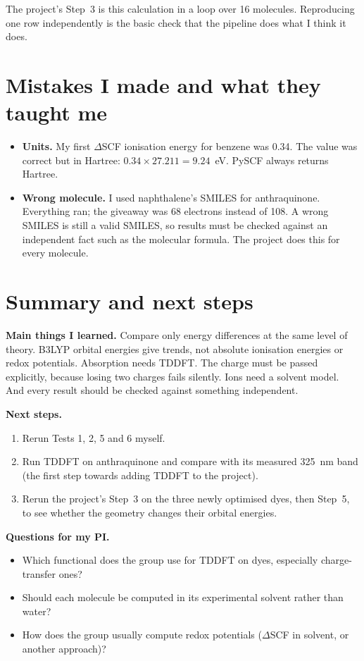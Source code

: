 \documentclass[11pt,a4paper]{article}
\begin{document}
\begin{matters}
The project's Step~3 is this calculation in a loop over 16 molecules. Reproducing one row
independently is the basic check that the pipeline does what I think it does.
\end{matters}

\section{Mistakes I made and what they taught me}
\begin{itemize}
  \item \textbf{Units.} My first $\Delta$SCF ionisation energy for benzene was 0.34. The value was
  correct but in Hartree: $0.34 \times 27.211 = 9.24$~eV. PySCF always returns Hartree.
  \item \textbf{Wrong molecule.} I used naphthalene's SMILES for anthraquinone. Everything ran;
  the giveaway was 68 electrons instead of 108. A wrong SMILES is still a valid SMILES, so
  results must be checked against an independent fact such as the molecular formula. The project
  does this for every molecule.
\end{itemize}

\section{Summary and next steps}

\textbf{Main things I learned.} Compare only energy differences at the same level of theory.
B3LYP orbital energies give trends, not absolute ionisation energies or redox potentials.
Absorption needs TDDFT. The charge must be passed explicitly, because losing two charges fails
silently. Ions need a solvent model. And every result should be checked against something
independent.

\textbf{Next steps.}
\begin{enumerate}
  \item Rerun Tests 1, 2, 5 and 6 myself.
  \item Run TDDFT on anthraquinone and compare with its measured 325~nm band (the first step
  towards adding TDDFT to the project).
  \item Rerun the project's Step~3 on the three newly optimised dyes, then Step~5, to see whether
  the geometry changes their orbital energies.
\end{enumerate}

\textbf{Questions for my PI.}
\begin{itemize}
  \item Which functional does the group use for TDDFT on dyes, especially charge-transfer ones?
  \item Should each molecule be computed in its experimental solvent rather than water?
  \item How does the group usually compute redox potentials ($\Delta$SCF in solvent, or another
  approach)?
\end{itemize}
\end{document}
